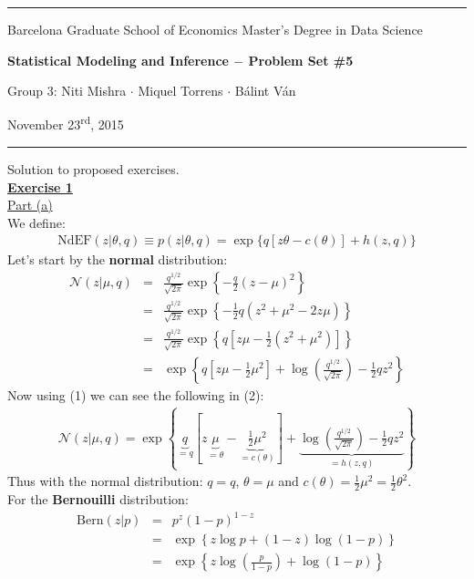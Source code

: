 \documentclass[a4paper, 11pt]{article}
\newcommand{\header}[4]{
	\begin{center}
		\rule{\linewidth}{0.5pt}
		
		{\small{#1}}
      
        \vspace{0.2in}
        
		{\large{#2}}
		
        \vspace{0.2in}
        
		{\small{#3}}
		
		\vspace{0.15in}
		
		{#4}
		
		\vspace{-0.1in}
		\rule{\linewidth}{0.6pt}
	\end{center}
}
\begin{document}
 
\header{\sc Barcelona Graduate School of Economics \hfill Master's Degree in Data Science}{\bf Statistical Modeling and Inference $-$ Problem Set \#5}{\sc Group 3: Niti Mishra $\cdot$ Miquel Torrens $\cdot$ B\'alint V\'an}{November 23\textsuperscript{rd}, 2015}
Solution to proposed exercises.\\
\newline \textbf{\underline{Exercise 1}}\\
\newline \underline{Part (a)}\\
\newline We define:
\begin{eqnarray}
\text{NdEF}(z | \theta, q) \equiv p(z | \theta, q) = \exp \lbrace q [z \theta - c(\theta)] + h(z,q) \rbrace
\end{eqnarray}
Let's start by the \textbf{normal} distribution:
\begin{eqnarray}
\mathcal{N}(z | \mu, q) &=& \frac{q^{1/2}}{\sqrt{2 \pi}} \exp \left\{ -\frac{q}{2} (z - \mu)^2 \right\}  \nonumber \\
&=& \frac{q^{1/2}}{\sqrt{2 \pi}} \exp \left\{ -\frac{1}{2} q (z^2 + \mu^2 - 2z\mu) \right\}  \nonumber \\
&=& \frac{q^{1/2}}{\sqrt{2 \pi}} \exp \left\{ q \left[z \mu -\frac{1}{2} \left( z^2 + \mu^2 \right) \right] \right\}  \nonumber \\
&=& \exp \left\{ q \left[ z \mu - \frac{1}{2} \mu^2 \right] + \log \left(  \frac{q^{1/2}}{\sqrt{2 \pi}} \right) - \frac{1}{2} q z^2  \right\}
\end{eqnarray}
Now using (1) we can see the following in (2):
\begin{eqnarray}
\mathcal{N}(z | \mu, q) = \exp \left\{ \underbrace{q}_{= q} \left[ z \underbrace{\mu}_{=\theta} - \underbrace{\frac{1}{2} \mu^2}_{=c(\theta)} \right]   + \underbrace{\log \left( \frac{q^{1/2}}{\sqrt{2 \pi}} \right) - \frac{1}{2} q z^2}_{=h(z,q)}  \right\}
\end{eqnarray}
Thus with the normal distribution: $q = q$, $\theta = \mu$ and $c(\theta) = \frac{1}{2} \mu^2 =  \frac{1}{2} \theta^2$.\\
\newline For the \textbf{Bernouilli} distribution:
\begin{eqnarray}
\text{Bern}(z | p) &=& p^z (1-p)^{1-z}  \nonumber \\
&=& \exp \left\{ z \log{p} + (1-z) \log{(1-p)} \right\} \nonumber \\
&=& \exp \left\{ z \log \left( \frac{p}{1-p} \right) + \log{(1-p)} \right\} \nonumber
\end{eqnarray}
\end{document}
